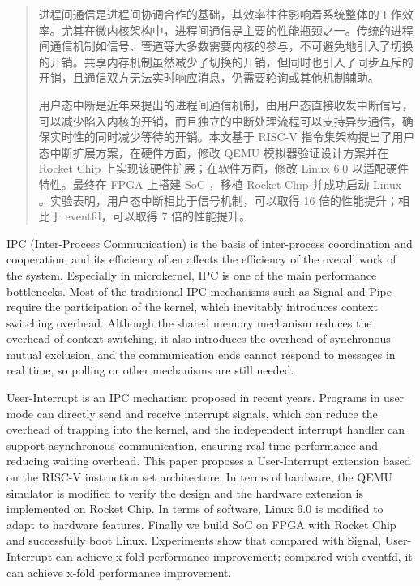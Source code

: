 
\begin{abstract}
  
  进程间通信是进程间协调合作的基础，其效率往往影响着系统整体的工作效率。尤其在微内核架构中，进程间通信是主要的性能瓶颈之一。传统的进程间通信机制如信号、管道等大多数需要内核的参与，不可避免地引入了切换的开销。共享内存机制虽然减少了切换的开销，但同时也引入了同步互斥的开销，且通信双方无法实时响应消息，仍需要轮询或其他机制辅助。
  
  用户态中断是近年来提出的进程间通信机制，由用户态直接收发中断信号，可以减少陷入内核的开销，而且独立的中断处理流程可以支持异步通信，确保实时性的同时减少等待的开销。本文基于 RISC-V 指令集架构提出了用户态中断扩展方案，在硬件方面，修改 QEMU 模拟器验证设计方案并在 Rocket Chip 上实现该硬件扩展；在软件方面，修改 Linux 6.0 以适配硬件特性。最终在 FPGA 上搭建 SoC ，移植 Rocket Chip 并成功启动 Linux 。实验表明，用户态中断相比于信号机制，可以取得 16 倍的性能提升；相比于 eventfd，可以取得 7 倍的性能提升。

\end{abstract}

\begin{abstract*}

  IPC (Inter-Process Communication) is the basis of inter-process coordination and cooperation, and its efficiency often affects the efficiency of the overall work of the system. Especially in microkernel, IPC is one of the main performance bottlenecks. Most of the traditional IPC mechanisms such as Signal and Pipe require the participation of the kernel, which inevitably introduces context switching overhead. Although the shared memory mechanism reduces the overhead of context switching, it also introduces the overhead of synchronous mutual exclusion, and the communication ends cannot respond to messages in real time, so polling or other mechanisms are still needed.
  
  User-Interrupt is an IPC mechanism proposed in recent years. Programs in user mode can directly send and receive interrupt signals, which can reduce the overhead of trapping into the kernel, and the independent interrupt handler can support asynchronous communication, ensuring real-time performance and reducing waiting overhead. This paper proposes a User-Interrupt extension based on the RISC-V instruction set architecture. In terms of hardware, the QEMU simulator is modified to verify the design and the hardware extension is implemented on Rocket Chip. In terms of software, Linux 6.0 is modified to adapt to hardware features. Finally we build SoC on FPGA with Rocket Chip and successfully boot Linux. Experiments show that compared with Signal, User-Interrupt can achieve x-fold performance improvement; compared with eventfd, it can achieve x-fold performance improvement.

\end{abstract*}
